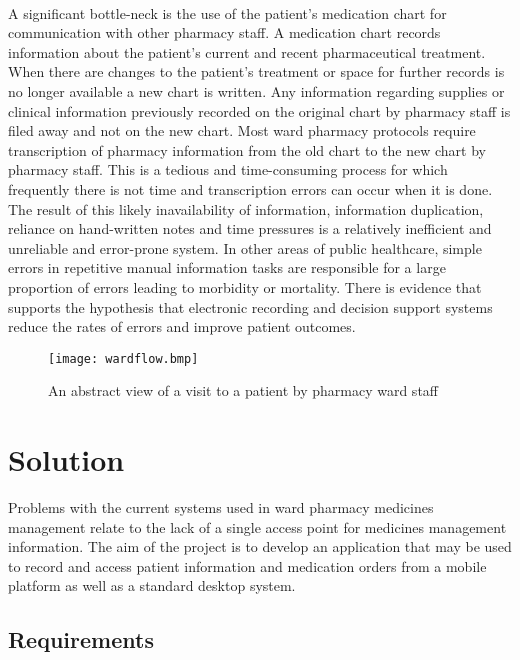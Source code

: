 \documentclass[letterpaper]{amsart}
\begin{document}
\paragraph{ }A significant bottle-neck is the use of the patient's medication chart for communication with other pharmacy staff.  A medication chart records information about the patient's current and recent pharmaceutical treatment. When there are changes to the patient's treatment or space for further records is no longer available a new chart is written.  Any information regarding supplies or clinical information previously recorded on the original chart by pharmacy staff is filed away and not on the new chart.  Most ward pharmacy protocols require transcription of pharmacy information from the old chart to the new chart by pharmacy staff. This is a tedious and time-consuming process for which frequently there is not time and transcription errors can occur when it is done.  \\The result of this likely inavailability of information, information duplication, reliance on hand-written notes and time pressures is a relatively inefficient and unreliable and error-prone system. 
In other areas of public healthcare, simple errors in repetitive manual information tasks are responsible for a large proportion of errors leading to morbidity or mortality. There is evidence that supports the hypothesis that electronic recording and decision support systems reduce the rates of errors and improve patient outcomes.
\begin{figure}[]
    \centering
    \texttt{[image: wardflow.bmp]}
    \caption{An abstract view of a visit to a patient by pharmacy ward staff}
    \label{workflow}
\end{figure}
\section{Solution}
Problems with the current systems used in ward pharmacy medicines management relate to the lack of a single access point for medicines management information.  The aim of the project is to develop an application that may be used to record and access patient information and medication orders from a mobile platform as well as a standard desktop system.

\paragraph{}
\subsection{Requirements}
\end{document}
